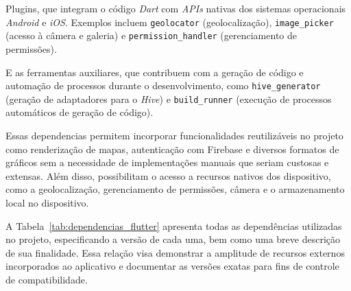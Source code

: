 Plugins, que integram o código \textit{Dart} com \textit{APIs} nativas dos 
sistemas operacionais \textit{Android} e \textit{iOS}. Exemplos incluem \texttt{geolocator}
 (geolocalização), 
\texttt{image\_picker} (acesso à câmera e galeria) e \texttt{permission\_handler} (gerenciamento 
de permissões).

E as ferramentas auxiliares, que contribuem com a geração 
de código e automação de processos durante o desenvolvimento, como \texttt{hive\_generator} 
(geração de adaptadores para o \textit{Hive}) e \texttt{build\_runner} (execução de processos automáticos de 
geração de código).

Essas dependencias permitem incorporar funcionalidades reutilizáveis no projeto 
como renderização de mapas, autenticação com Firebase e diversos formatos de gráficos 
sem a necessidade de implementações manuais que seriam custosas e extensas. 
Além disso, possibilitam o acesso a recursos nativos dos dispositivo, como a 
geolocalização, gerenciamento de permissões, câmera e o armazenamento local no dispositivo.

A Tabela~\ref{tab:dependencias_flutter} apresenta todas as dependências utilizadas 
no projeto, especificando a versão de cada uma, bem como uma breve 
descrição de sua finalidade. Essa relação visa demonstrar a amplitude de recursos externos 
incorporados ao aplicativo e documentar as versões exatas para fins de controle de compatibilidade.

